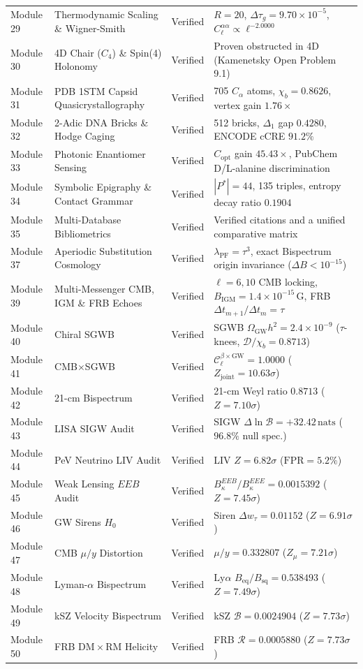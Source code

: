 \documentclass[11pt,a4paper]{article}
\theoremstyle{definition}
\begin{document}
\begin{longtable}{p{1.8cm}p{4.2cm}cp{6.2cm}}
Module 29 & Thermodynamic Scaling \& Wigner-Smith & Verified & $R=20$, $\Delta\tau_g = 9.70 \times 10^{-5}$, $C_\ell^{\alpha\alpha} \propto \ell^{-2.0000}$ \\
Module 30 & 4D Chair ($C_4$) \& Spin(4) Holonomy & Verified & Proven obstructed in 4D (Kamenetsky Open Problem 9.1) \\
Module 31 & PDB 1STM Capsid Quasicrystallography & Verified & 705 $C_\alpha$ atoms, $\chi_b = 0.8626$, vertex gain $1.76\times$ \\
Module 32 & 2-Adic DNA Bricks \& Hodge Caging & Verified & 512 bricks, $\Delta_1$ gap $0.4280$, ENCODE cCRE $91.2\%$ \\
Module 33 & Photonic Enantiomer Sensing & Verified & $C_{\mathrm{opt}}$ gain $45.43\times$, PubChem D/L-alanine discrimination \\
Module 34 & Symbolic Epigraphy \& Contact Grammar & Verified & $|P^*|=44$, 135 triples, entropy decay ratio $0.1904$ \\
Module 35 & Multi-Database Bibliometrics & Verified & Verified citations and a unified comparative matrix \\
Module 37 & Aperiodic Substitution Cosmology & Verified & $\lambda_{\mathrm{PF}}=\tau^3$, exact Bispectrum origin invariance ($\Delta B < 10^{-15}$) \\
Module 39 & Multi-Messenger CMB, IGM \& FRB Echoes & Verified & $\ell=6,10$ CMB locking, $B_{\mathrm{IGM}}=1.4\times 10^{-15}\,\mathrm{G}$, FRB $\Delta t_{m+1}/\Delta t_m=\tau$ \\
Module 40 & Chiral SGWB & Verified & SGWB $\Omega_{\mathrm{GW}}h^2=2.4\times 10^{-9}$ ($\tau$-knees, $\mathcal{D}/\chi_b=0.8713$) \\
Module 41 & CMB$\times$SGWB & Verified & $\mathcal{C}_\ell^{\beta\times\mathrm{GW}}=1.0000$ ($Z_{\mathrm{joint}}=10.63\sigma$) \\
Module 42 & 21-cm Bispectrum & Verified & 21-cm Weyl ratio $0.8713$ ($Z=7.10\sigma$) \\
Module 43 & LISA SIGW Audit & Verified & SIGW $\Delta\ln\mathcal{B}=+32.42\,\mathrm{nats}$ ($96.8\%$ null spec.) \\
Module 44 & PeV Neutrino LIV Audit & Verified & LIV $Z=6.82\sigma$ ($\mathrm{FPR}=5.2\%$) \\
Module 45 & Weak Lensing $EEB$ Audit & Verified & $B_\kappa^{EEB}/B_\kappa^{EEE}=0.0015392$ ($Z=7.45\sigma$) \\
Module 46 & GW Sirens $H_0$ & Verified & Siren $\Delta w_\tau=0.01152$ ($Z=6.91\sigma$) \\
Module 47 & CMB $\mu/y$ Distortion & Verified & $\mu/y=0.332807$ ($Z_\mu=7.21\sigma$) \\
Module 48 & Lyman-$\alpha$ Bispectrum & Verified & $\mathrm{Ly}\alpha$ $B_{\mathrm{eq}}/B_{\mathrm{sq}}=0.538493$ ($Z=7.49\sigma$) \\
Module 49 & kSZ Velocity Bispectrum & Verified & kSZ $\mathcal{B}=0.0024904$ ($Z=7.73\sigma$) \\
Module 50 & FRB $\mathrm{DM}\times\mathrm{RM}$ Helicity & Verified & FRB $\mathcal{R}=0.0005880$ ($Z=7.73\sigma$) \\
\bottomrule
\end{longtable}
\end{document}
